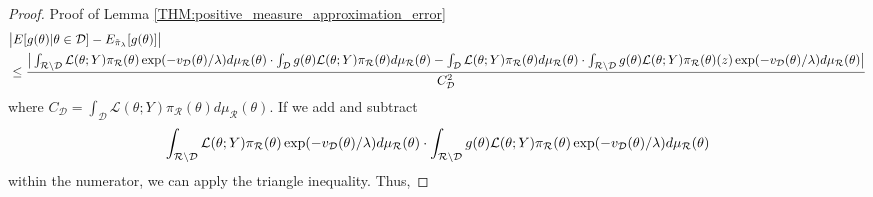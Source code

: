 \documentclass[10pt,fleqn]{article} \pdfoutput=1
\DeclareMathOperator{\1}{\mathbbm{1}} \DeclareMathOperator{\bigO}{\mc O}
\begin{document}
\begin{proof}{Proof of
		Lemma \ref{THM:positive_measure_approximation_error}}
	\begin{equation*} \begin{split} &\big|
			E[g(\theta)|\theta\in\mathcal{D}]-E_{\tilde{\pi}_\lambda}[g(\theta)]\big|
			\\ &\le \frac{\big|\int_{\mathcal{R}\setminus \mathcal{D}}
				\mathcal{L}(\theta;Y)\pi_\mathcal{R}(\theta)\exp(-v_{\mathcal{D}}(\theta)/\lambda
				) d\mu_\mathcal{R}(\theta) \cdot \int_\mathcal{D}g(\theta)
				\mathcal{L}(\theta;Y)\pi_\mathcal{R}(\theta)d\mu_\mathcal{R}(\theta)
				-\int_\mathcal{D}\mathcal{L}(\theta;Y)\pi_\mathcal{R}(\theta)d\mu_\mathcal{R}(\theta)
				\cdot \int_{\mathcal{R}\setminus \mathcal{D} }
				g(\theta)\mathcal{L}(\theta;Y)\pi_\mathcal{R}(\theta)(z)\exp(-v_{\mathcal{D}}(\theta)/\lambda)
				d\mu_\mathcal{R}(\theta)\big|}{C_\mathcal{D}^2 } \end{split}
	\end{equation*} where $C_\mathcal{D} = \int_\mathcal{D}
		\mathcal{L}(\theta;Y)\pi_\mathcal{R}(\theta) d\mu_\mathcal{R}(\theta).$  If
	we add and subtract $$\int_{\mathcal{R}\setminus \mathcal{D}}
		\mathcal{L}(\theta;Y)\pi_\mathcal{R}(\theta)\exp(-v_{\mathcal{D}}(\theta)/\lambda )
		d\mu_\mathcal{R}(\theta) \cdot \int_{\mathcal{R}\setminus \mathcal{D}}
		g(\theta)
		\mathcal{L}(\theta;Y)\pi_\mathcal{R}(\theta)\exp(-v_{\mathcal{D}}(\theta)/\lambda )
		d\mu_\mathcal{R}(\theta)  $$ within the numerator, we can apply the
	triangle inequality. Thus,


\end{proof}
\end{document}
